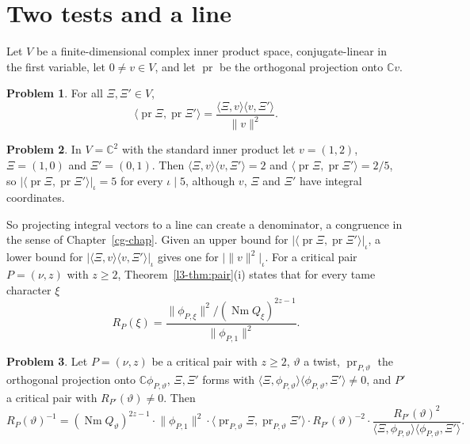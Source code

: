 \documentclass[reqno]{amsart}
\newcounter{chap}
\theoremstyle{definition}
\newtheorem{problem}{Problem}[section]
\theoremstyle{plain}
\theoremstyle{remark}
\newcommand{\C}{\mathbb{C}}
\newcommand{\Nm}{\operatorname{Nm}}
\newcommand{\pr}{\operatorname{pr}}
\begin{document}
\section{Two tests and a line}\label{sec:line}

Let \(V\) be a finite-dimensional complex inner product space, conjugate-linear in the first variable, let \(0 \ne v \in V\), and let \(\pr\) be the orthogonal projection onto \(\C v\).

\begin{problem}\label{pr:line}
For all \(\Xi, \Xi' \in V\),
\[
  \langle \pr\Xi, \pr\Xi'\rangle = \frac{\langle\Xi, v\rangle\langle v, \Xi'\rangle}{\lVert v\rVert^2} .
\]
\end{problem}

\begin{problem}\label{pr:line-toy}
In \(V = \C^2\) with the standard inner product let \(v = (1,2)\), \(\Xi = (1,0)\) and \(\Xi' = (0,1)\).  Then \(\langle\Xi,v\rangle\langle v,\Xi'\rangle = 2\) and \(\langle\pr\Xi, \pr\Xi'\rangle = 2/5\), so \(\lvert\langle\pr\Xi,\pr\Xi'\rangle\rvert_\iota = 5\) for every \(\iota \mid 5\), although \(v\), \(\Xi\) and \(\Xi'\) have integral coordinates.
\end{problem}

So projecting integral vectors to a line can create a denominator, a congruence in the sense of Chapter~\ref{cg-chap}.  Given an upper bound for \(\lvert\langle\pr\Xi,\pr\Xi'\rangle\rvert_\iota\), a lower bound for \(\lvert\langle\Xi,v\rangle\langle v,\Xi'\rangle\rvert_\iota\) gives one for \(\lvert\lVert v\rVert^2\rvert_\iota\).  For a critical pair \(P = (\nu, z)\) with \(z \ge 2\), Theorem~\ref{l3-thm:pair}(i) states that for every tame character \(\xi\)
\[
  R_P(\xi) = \frac{\lVert\phi_{P,\xi}\rVert^2/(\Nm Q_\xi)^{2z-1}}{\lVert\phi_{P,1}\rVert^2} .
\]

\begin{problem}\label{pr:five}
Let \(P = (\nu, z)\) be a critical pair with \(z \ge 2\), \(\vartheta\) a twist, \(\pr_{P,\vartheta}\) the orthogonal projection onto \(\C\phi_{P,\vartheta}\), \(\Xi, \Xi'\) forms with \(\langle\Xi,\phi_{P,\vartheta}\rangle\langle\phi_{P,\vartheta},\Xi'\rangle \ne 0\), and \(P'\) a critical pair with \(R_{P'}(\vartheta) \ne 0\).  Then
\[
  R_P(\vartheta)^{-1} = (\Nm Q_\vartheta)^{2z-1} \cdot \lVert\phi_{P,1}\rVert^2 \cdot \langle\pr_{P,\vartheta}\Xi, \pr_{P,\vartheta}\Xi'\rangle \cdot R_{P'}(\vartheta)^{-2} \cdot \frac{R_{P'}(\vartheta)^2}{\langle\Xi,\phi_{P,\vartheta}\rangle\langle\phi_{P,\vartheta},\Xi'\rangle} .
\]
\end{problem}
\end{document}
